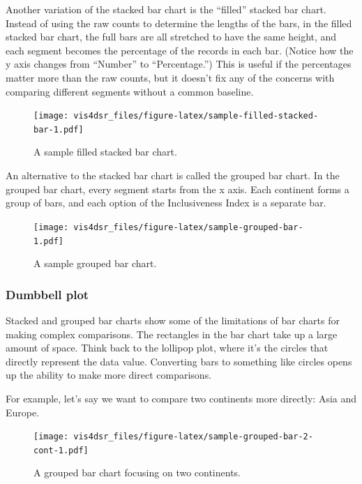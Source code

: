 \documentclass[
]{krantz}
\begin{document}
Another variation of the stacked bar chart is the ``filled'' stacked bar chart.
Instead of using the raw counts to determine the lengths of the bars, in the
filled stacked bar chart, the full bars are all stretched to have the same height,
and each segment becomes the percentage of the records in each bar. (Notice how
the y axis changes from ``Number'' to ``Percentage.'') This is useful if the percentages
matter more than the raw counts, but it doesn't fix any of the concerns with
comparing different segments without a common baseline.

\begin{figure}
\centering
\texttt{[image: vis4dsr\_files/figure-latex/sample-filled-stacked-bar-1.pdf]}
\caption{\label{fig:sample-filled-stacked-bar}A sample filled stacked bar chart.}
\end{figure}

An alternative to the stacked bar chart is called the grouped bar chart. In the
grouped bar chart, every segment starts from the x axis. Each continent forms a
group of bars, and each option of the Inclusiveness Index is a separate bar.

\begin{figure}
\centering
\texttt{[image: vis4dsr\_files/figure-latex/sample-grouped-bar-1.pdf]}
\caption{\label{fig:sample-grouped-bar}A sample grouped bar chart.}
\end{figure}

\hypertarget{dumbbell-plot}{%
\subsubsection{Dumbbell plot}\label{dumbbell-plot}}

Stacked and grouped bar charts show some of the limitations of bar charts for
making complex comparisons. The rectangles in the bar chart take up a large amount
of space. Think back to the lollipop plot, where it's the circles that directly
represent the data value. Converting bars to something like circles opens up the
ability to make more direct comparisons.

For example, let's say we want to compare two continents more directly: Asia and Europe.

\begin{figure}
\centering
\texttt{[image: vis4dsr\_files/figure-latex/sample-grouped-bar-2-cont-1.pdf]}
\caption{\label{fig:sample-grouped-bar-2-cont}A grouped bar chart focusing on two continents.}
\end{figure}
\end{document}
